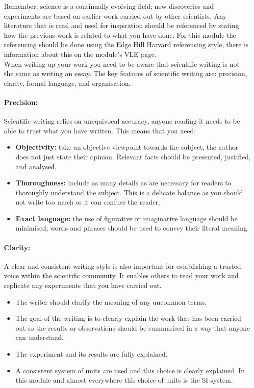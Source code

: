 Remember, science is a continually evolving field; new discoveries and experiments are based on earlier work carried out by other scientists. Any literature that is read and used for inspiration should be referenced by stating how the previous work is related to what you have done. For this module the referencing should be done using the Edge Hill Harvard referencing style, there is information about this on the module's VLE page. \\

When writing up your work you need to be aware that scientific writing is not the same as writing an essay. The key features of scientific writing are: precision, clarity, formal language, and organisation. 

\paragraph{Precision:} Scientific writing relies on unequivocal accuracy, anyone reading it needs to be able to trust what you have written. This means that you need:
\begin{itemize}
\setlength{\itemsep}{-5pt}
    \item \textbf{Objectivity:} take an objective viewpoint towards the subject, the author does not just state their opinion. Relevant facts should be presented, justified, and analysed.
    \item \textbf{Thoroughness:} include as many details as are necessary for readers to thoroughly understand the subject. This is a delicate balance as you should not write too much or it can confuse the reader.
    \item \textbf{Exact language:} the use of figurative or imaginative language should be minimised; words and phrases should be used to convey their literal meaning.
\end{itemize}

\paragraph{Clarity:}A clear and consistent writing style is also important for establishing a trusted voice within the scientific community. It enables others to read your work and replicate any experiments that you have carried out.
\begin{itemize}
\setlength{\itemsep}{-5pt}
    \item The writer should clarify the meaning of any uncommon terms.
    \item The goal of the writing is to clearly explain the work that has been carried out so the results or observations should be summarised in a way that anyone can understand.
    \item The experiment and its results are fully explained.
    \item A consistent system of units are used and this choice is clearly explained. In this module and almost everywhere this choice of units is the SI system.
\end{itemize}

